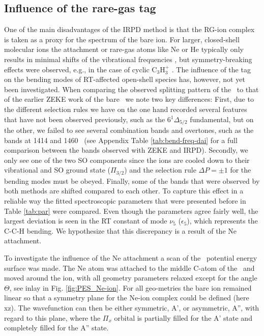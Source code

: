 \subsection{Influence of the rare-gas tag}
\label{sec:ne-att}
One of the main disadvantages of the IRPD method is that the RG-ion complex is taken as a proxy for the spectrum of the bare ion. 
For larger, closed-shell molecular ions the attachment or rare-gas atoms like Ne or He typically only results in minimal shifts of the vibrational frequencies \cite{Marimuthu2020LaboratorySpectroscopy, Marimuthu2021InfraredCH3CNH+, Thorwirth2020Molecular+, Jasik2013, Douberly2008}, but symmetry-breaking effects were observed, e.g., in the case of cyclic C$_3$H$_3^+$ \cite{Dopfer2002InfraredIsomers, Botschwina2011}.
The influence of the tag on the bending modes of RT-affected open-shell species has, however, not yet been investigated. 
When comparing the observed splitting pattern of the \neion\ to that of the earlier ZEKE work \cite{Dai2015TheCalculations} of the bare \ion\ we note two key differences: First, due to the different selection rules we have on the one hand recorded several features that have not been observed previously, such as the 6$^1\Delta_{5/2}$ fundamental, but on the other, we failed to see several combination bands and overtones, such as the bands at 1414 and 1460 \wn\ (see Appendix Table \ref{tab:bend-freq-dai} for a full comparison between the bands observed with ZEKE \cite{Dai2015TheCalculations} and IRPD). 
Secondly, we only see one of the two SO components since the ions are cooled down to their vibrational and SO ground state ($\Pi_{3/2}$) and the selection rule $\Delta P = \pm 1$ for the bending modes must be obeyed.
Finally, some of the bands that were observed by both methods are shifted compared to each other.
To capture this effect in a reliable way the fitted spectroscopic parameters that were presented before in Table \ref{tab:par} were compared. 
Even though the parameters agree fairly well, the largest deviation is seen in the RT constant of mode $\nu_5$ ($\epsilon_5$), which represents the C-C-H bending.
We hypothesize that this discrepancy is a result of the Ne attachment.

To investigate the influence of the Ne attachment a scan of the \neion\ potential energy surface was made. 
The Ne atom was attached to the middle C-atom of the \ion\ and moved around the ion, with all geometry parameters relaxed except for the angle $\Theta$, see inlay in Fig. \ref{fig:PES_Ne-ion}.
For all \neion geo-metries the bare ion remained linear so that a symmetry plane for the Ne-ion
complex could be defined (here xz). The wavefunction can then be either symmetric, A’, or
asymmetric, A”, with regard to this plane, where the $\Pi_x$ orbital is partially filled for the A’ state and
completely filled for the A” state. 

